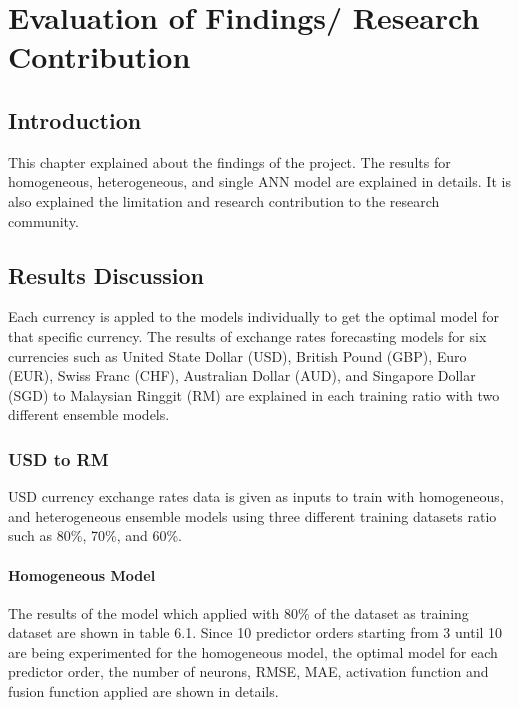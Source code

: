 \chapter{ Evaluation of Findings/ Research Contribution }
\section{Introduction}
This chapter explained about the findings of the project. The results for homogeneous, heterogeneous, and single ANN model are explained in details. It is also explained the limitation and research contribution to the research community.

\section{Results Discussion}

Each currency is appled to the models individually to get the optimal model for that specific currency. The results of exchange rates forecasting models for six currencies such as United State Dollar (USD), British Pound (GBP), Euro (EUR), Swiss Franc (CHF), Australian Dollar (AUD), and Singapore Dollar (SGD) to Malaysian Ringgit (RM)  are explained in each training ratio with two different ensemble models.

\subsection{USD to RM}

USD currency exchange rates data is given as inputs to train with homogeneous, and heterogeneous ensemble models using three different training datasets ratio such as 80\%, 70\%, and 60\%. 

\subsubsection{Homogeneous Model}

The results of the model which applied with 80\% of the dataset as training dataset are shown in table 6.1. Since 10 predictor orders starting from 3 until 10  are being experimented for the homogeneous model, the optimal model for each predictor order, the number of neurons, RMSE, MAE, activation function and fusion function applied are shown in details.
	
